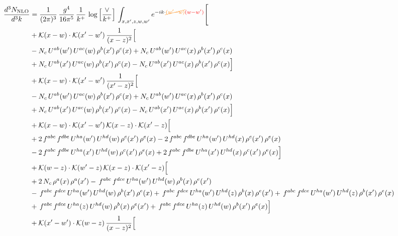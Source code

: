 \documentclass[9pt]{article}
\numberwithin{equation}{section}
\begin{document}
\begin{align}
\frac{d^{3}N_{\mathrm{NLO}}}{d^{3}k} & = \frac{1}{(2\pi)^{3}}\,\frac{g^{4}}{16\pi^{5}}\,\frac{1}{k^{+}}\,\log\Big[\frac{\vee}{k^{+}}\Big]\,\int_{x,x',z,w,w'}e^{-ik\cdot{\color{orange}\cancel{(w'-w)}}{\color{red}(w-w')}}\Bigg[ \notag\\
& +\mathcal{K}(x-w)\cdot\mathcal{K}(x'-w')\,\frac{1}{(x-z)^{2}}\Big[\notag\\
& -N_{c}\,U^{ab}(w')\,U^{ac}(w)\,\rho^{b}(x')\,\rho^{c}(x) +N_{c}\,U^{ab}(w')\,U^{ac}(x)\,\rho^{b}(x')\,\rho^{c}(x)\notag\\
& +N_{c}\,U^{ab}(x')\,U^{ac}(w)\,\rho^{b}(x')\,\rho^{c}(x) -N_{c}\,U^{ab}(x')\,U^{ac}(x)\,\rho^{b}(x')\,\rho^{c}(x)\Big]\notag\\
& +\mathcal{K}(x-w)\cdot\mathcal{K}(x'-w')\,\frac{1}{(x'-z)^{2}}\Big[\notag\\
& -N_{c}\,U^{ab}(w')\,U^{ac}(w)\,\rho^{b}(x')\,\rho^{c}(x) +N_{c}\,U^{ab}(w')\,U^{ac}(x)\,\rho^{b}(x')\,\rho^{c}(x)\notag\\
& +N_{c}\,U^{ab}(x')\,U^{ac}(w)\,\rho^{b}(x')\,\rho^{c}(x) -N_{c}\,U^{ab}(x')\,U^{ac}(x)\,\rho^{b}(x')\,\rho^{c}(x)\Big]\notag\\
& +\mathcal{K}(x-w)\cdot\mathcal{K}(x'-w')\,\mathcal{K}(x-z)\cdot\mathcal{K}(x'-z)\Big[\notag\\
& +2\,f^{abc}\,f^{dbe}\,U^{ha}(w')\,U^{hd}(w)\,\rho^{c}(x')\,\rho^{e}(x) -2\,f^{abc}\,f^{dbe}\,U^{ha}(w')\,U^{hd}(x)\,\rho^{c}(x')\,\rho^{e}(x)\notag\\
& -2\,f^{abc}\,f^{dbe}\,U^{ha}(x')\,U^{hd}(w)\,\rho^{c}(x')\,\rho^{e}(x) +2\,f^{abc}\,f^{dbe}\,U^{ha}(x')\,U^{hd}(x)\,\rho^{c}(x')\,\rho^{e}(x)\Big]\notag\\
& +\mathcal{K}(w-z)\cdot\mathcal{K}(w'-z)\,\mathcal{K}(x-z)\cdot\mathcal{K}(x'-z)\Big[\notag\\
& +2\,N_{c}\,\rho^{a}(x)\,\rho^{a}(x') -\,f^{abc}\,f^{dce}\,U^{ha}(w')\,U^{hd}(w)\,\rho^{b}(x)\,\rho^{e}(x')\notag\\
& -\,f^{abc}\,f^{dce}\,U^{ha}(w')\,U^{hd}(w)\,\rho^{b}(x')\,\rho^{e}(x) +\,f^{abc}\,f^{dce}\,U^{ha}(w')\,U^{hd}(z)\,\rho^{b}(x)\,\rho^{e}(x') +\,f^{abc}\,f^{dce}\,U^{ha}(w')\,U^{hd}(z)\,\rho^{b}(x')\,\rho^{e}(x)\notag\\
& +\,f^{abc}\,f^{dce}\,U^{ha}(z)\,U^{hd}(w)\,\rho^{b}(x)\,\rho^{e}(x') +\,f^{abc}\,f^{dce}\,U^{ha}(z)\,U^{hd}(w)\,\rho^{b}(x')\,\rho^{e}(x)\Big]\notag\\
& +\mathcal{K}(x'-w')\cdot\mathcal{K}(w-z)\,\frac{1}{(x-z)^{2}}\Big[\notag\\

\end{align}
\end{document}
